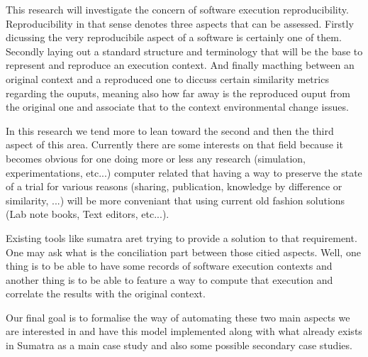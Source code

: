 This research will investigate the concern of software execution reproducibility.
Reproducibility in that sense denotes three aspects that can be assessed. Firstly dicussing the very
reproducibile aspect of a software is certainly one of them. Secondly laying out a standard structure and
 terminology that will be the base to represent and reproduce an execution context. And finally
 macthing between an original context and a reproduced one to diccuss certain similarity metrics regarding
the ouputs, meaning also how far away is the reproduced ouput from the original one and associate that to
the context environmental change issues.

In this research we tend more to lean toward the second and then the third aspect of this area.
Currently there are some interests on that field because it becomes obvious for one doing more or 
less any research (simulation, experimentations, etc...) computer related that having a way to preserve
the state of a trial for various reasons (sharing, publication, knowledge by difference or similarity, ...)
will be more conveniant that using current old fashion solutions (Lab note books, Text editors, etc...).

Existing tools like sumatra aret trying to provide a solution to that requirement.
One may ask what is the conciliation part between those citied aspects. Well, one thing is to be
able to have some records of software execution contexts and another thing is to be able to feature
a way to compute that execution and correlate the results with the original context.

Our final goal is to formalise the way of automating these two main aspects we are interested in and 
have this model implemented along with what already exists in Sumatra as a main case study and also
some possible secondary case studies.
